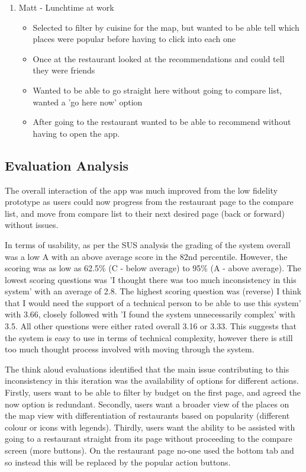 \documentclass[a4 paper, 12pt]{article}
\begin{document}
\begin{enumerate}
            \item Matt - Lunchtime at work
                \begin{itemize}
                    \item Selected to filter by cuisine for the map, but wanted to be able tell which places were popular before having to click into each one
                    \item Once at the restaurant looked at the recommendations and could tell they were friends
                    \item Wanted to be able to go straight here without going to compare list, wanted a 'go here now' option
                    \item After going to the restaurant wanted to be able to recommend without having to open the app.
                \end{itemize}
        \end{enumerate}

    \subsection{Evaluation Analysis}
    The overall interaction of the app was much improved from the low fidelity prototype as users could now progress from the restaurant page to the compare list, and move from compare list to their next desired page (back or forward) without issues. 

    In terms of usability, as per the SUS analysis the grading of the system overall was a low A with an above average score in the 82nd percentile. However, the scoring was as low as 62.5\% (C - below average) to 95\% (A - above average). The lowest scoring questions was 'I thought there was too much inconsistency in this system' with an average of 2.8. The highest scoring question was (reverse) I think that I would need the support of a technical person to be able to use this system' with 3.66, closely followed with 'I found the system unnecessarily complex' with 3.5. All other questions were either rated overall 3.16 or 3.33. This suggests that the system is easy to use in terms of technical complexity, however there is still too much thought process involved with moving through the system.

    The think aloud evaluations identified that the main issue contributing to this inconsistency in this iteration was the availability of options for different actions. Firstly, users want to be able to filter by budget on the first page, and agreed the now option is redundant. Secondly, users want a broader view of the places on the map view with differentiation of restaurants based on popularity (different colour or icons with legends). Thirdly, users want the ability to be assisted with going to a restaurant straight from its page without proceeding to the compare screen (more buttons). On the restaurant page no-one used the bottom tab and so instead this will be replaced by the popular action buttons. 
\end{document}
